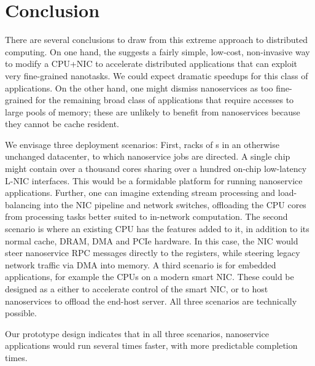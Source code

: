 \section{Conclusion}
There are several conclusions to draw from this extreme approach to distributed computing. 
On one hand, the \name{} suggests a fairly simple, low-cost, non-invasive way to modify a CPU+NIC to accelerate distributed applications that can exploit very fine-grained nanotasks. 
We could expect dramatic speedups for this class of applications. 
On the other hand, one might dismiss nanoservices as too fine-grained for the remaining broad class of applications that require accesses to large pools of memory; these are unlikely to benefit from nanoservices because they cannot be cache resident. 

We envisage three deployment scenarios: First, racks of \name{}s in an otherwise unchanged datacenter, to which nanoservice jobs are directed. 
A single chip might contain over a thousand \name{} cores sharing over a hundred on-chip low-latency L-NIC interfaces. 
This would be a formidable platform for running nanoservice applications. 
Further, one can imagine extending stream processing and load-balancing into the NIC pipeline and network switches, offloading the CPU cores from processing tasks better suited to in-network computation. 
The second scenario is where an existing CPU has the \name{} features added to it, in addition to its normal cache, DRAM, DMA and PCIe hardware. 
In this case, the NIC would steer nanoservice RPC messages directly to the registers, while steering legacy network traffic via DMA into memory. 
A third scenario is for embedded applications, for example the CPUs on a modern smart NIC. 
These could be designed as a \name{} either to accelerate control of the smart NIC, or to host nanoservices to offload the end-host server. 
All three scenarios are technically possible. 

Our \name{} prototype design indicates that in all three scenarios, nanoservice applications would run several times faster, with more predictable completion times.
